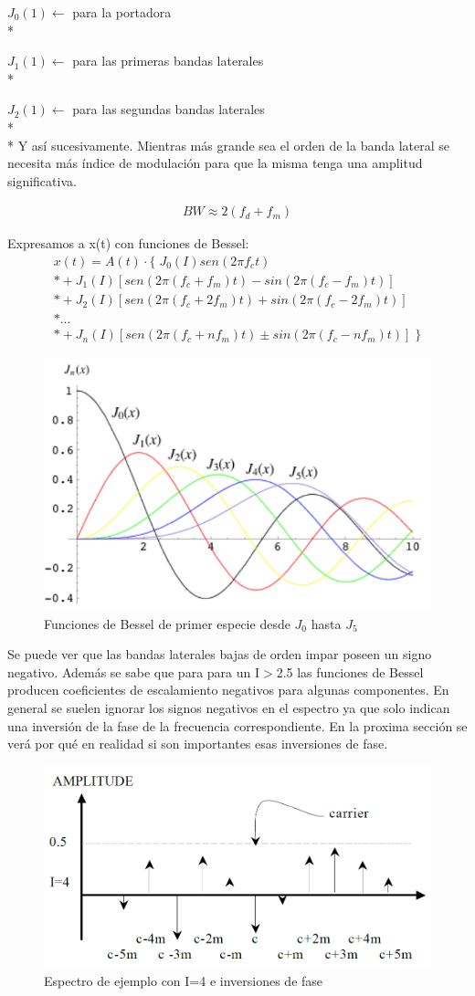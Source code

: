 \documentclass[assd_tp2_main.tex]{subfiles}
\begin{document}
$J_{0}(1)\longleftarrow$  para la portadora \\*

$J_{1}(1)\longleftarrow$  para las primeras bandas laterales \\*

$J_{2}(1)\longleftarrow$  para las segundas bandas laterales \\*
\\*
Y así sucesivamente.
Mientras más grande sea el orden de la banda lateral se necesita más índice de modulación para que la misma tenga una amplitud significativa.

\begin{eqnarray*}
\displaystyle BW \approx 2(f_d+f_m)
\end{eqnarray*}

Expresamos a x(t) con funciones de Bessel:
\begin{eqnarray*}
\textstyle x(t)=A(t)\cdot \{ \; J_{0}(I)sen(2\pi f_c t) \\*
				+J_1(I)[sen(2\pi(f_c+f_m)t) - sin(2\pi(f_c-f_m)t)] \\*
				+J_2(I)[sen(2\pi(f_c+2f_m)t) + sin(2\pi(f_c-2f_m)t)] \\*
				... \\*
				+J_n(I)[sen(2\pi(f_c+n f_m)t) \pm sin(2\pi(f_c-n f_m)t)] \; \}
\end{eqnarray*}

\begin{figure}[H]
\centering
\includegraphics[width=0.4\linewidth]{graficos/EJ4/Bessel.png}
\caption{Funciones de Bessel de primer especie desde $J_0$ hasta $J_5$ }
\label{fig:Bessel}
\end{figure}

Se puede ver que las bandas laterales bajas de orden impar poseen un signo negativo. Además se sabe que para para un I$>$2.5
las funciones de Bessel producen coeficientes de escalamiento negativos para algunas componentes.
En general se suelen ignorar los signos negativos en el espectro ya que solo indican una inversión de la fase de la frecuencia correspondiente. En la proxima sección se verá por qué en realidad si son importantes esas inversiones de fase.
\begin{figure}[H]
\centering
\includegraphics[width=0.4\linewidth]{graficos/EJ4/signos.png}
\caption{Espectro de ejemplo con I=4 e inversiones de fase}
\label{fig:signos}
\end{figure}
\end{document}
